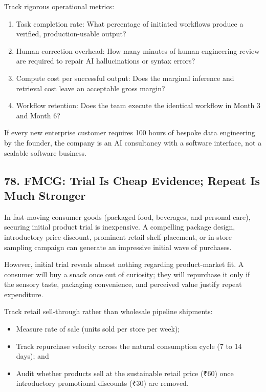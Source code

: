 Track rigorous operational metrics:
\begin{enumerate}
    \item Task completion rate: What percentage of initiated workflows produce a verified, production-usable output?
    \item Human correction overhead: How many minutes of human engineering review are required to repair AI hallucinations or syntax errors?
    \item Compute cost per successful output: Does the marginal inference and retrieval cost leave an acceptable gross margin?
    \item Workflow retention: Does the team execute the identical workflow in Month 3 and Month 6?
\end{enumerate}

If every new enterprise customer requires 100 hours of bespoke data engineering by the founder, the company is an AI consultancy with a software interface, not a scalable software business.

\subsection*{78. FMCG: Trial Is Cheap Evidence; Repeat Is Much Stronger}

In fast-moving consumer goods (packaged food, beverages, and personal care), securing initial product trial is inexpensive. A compelling package design, introductory price discount, prominent retail shelf placement, or in-store sampling campaign can generate an impressive initial wave of purchases.

However, initial trial reveals almost nothing regarding product-market fit. A consumer will buy a snack once out of curiosity; they will repurchase it only if the sensory taste, packaging convenience, and perceived value justify repeat expenditure.

Track retail sell-through rather than wholesale pipeline shipments:
\begin{itemize}
    \item Measure rate of sale (units sold per store per week);
    \item Track repurchase velocity across the natural consumption cycle (7 to 14 days); and
    \item Audit whether products sell at the sustainable retail price (₹60) once introductory promotional discounts (₹30) are removed.
\end{itemize}

